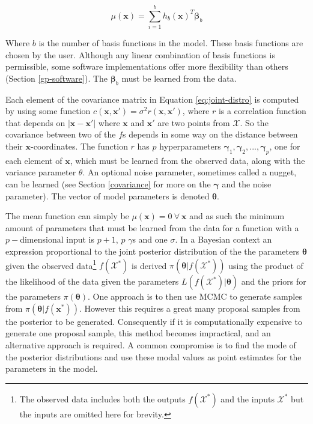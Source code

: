 \documentclass[
  12pt,
  a4paper,
  twoside]{book}
\begin{document}
\begin{equation}
\label{eq:mean-function}
\mu(\mathbf{x}) = \sum_{i=1}^b h_b(\mathbf{x})^T \mathbf{\beta}_b
\end{equation}

Where \(b\) is the number of basis functions in the model. These basis functions are chosen by the user. Although any linear combination of basis functions is permissible, some software implementations offer more flexibility than others (Section \ref{gp-software}). The \(\mathbf{\beta}_b\) must be learned from the data.

Each element of the covariance matrix in Equation \eqref{eq:joint-distro} is computed by using some function \(c(\mathbf{x}, \mathbf{x'})=\sigma^2 r(\mathbf{x}, \mathbf{x'})\), where \(r\) is a correlation function that depends on \(|\mathbf{x} - \mathbf{x'}|\) where \(\mathbf{x}\) and \(\mathbf{x'}\) are two points from \(\mathcal{X}\). So the covariance between two of the \(f\)s depends in some way on the distance between their \(\mathbf{x}\)-coordinates. The function \(r\) has \(p\) hyperparameters \(\mathbf{\gamma}_1,\mathbf{\gamma}_2,...,\mathbf{\gamma}_p\), one for each element of \(\mathbf{x}\), which must be learned from the observed data, along with the variance parameter \(\theta\). An optional noise parameter, sometimes called a nugget, can be learned (see Section \ref{covariance} for more on the \(\mathbf{\gamma}\) and the noise parameter). The vector of model parameters is denoted \(\mathbf{\theta}\).

The mean function can simply be \(\mu(\mathbf{x})=0~\forall~\mathbf{x}\) and as such the minimum amount of parameters that must be learned from the data for a function with a \(p-\)dimensional input is \(p+1\), \(p\) \(\gamma\)s and one \(\sigma\). In a Bayesian context an expression proportional to the joint posterior distribution of the the parameters \(\mathbf{\theta}\) given the observed data\footnote{The observed data includes both the outputs \(f(\mathcal{X^*})\) and the inputs \(\mathcal{X}^*\) but the inputs are omitted here for brevity.} \(f(\mathcal{X^*})\) is derived \(\pi(\mathbf{\theta}|f(\mathcal{X^*}))\) using the product of the likelihood of the data given the parameters \(L(f(\mathcal{X^*})| \mathbf{\theta})\) and the priors for the parameters \(\pi(\mathbf{\theta})\). One approach is to then use MCMC to generate samples from \(\pi(\mathbf{\theta}|f(\mathbf{\mathbf{x^*}}))\). However this requires a great many proposal samples from the posterior to be generated. Consequently if it is computationally expensive to generate one proposal sample, this method becomes impractical, and an alternative approach is required. A common compromise is to find the mode of the posterior distributions and use these modal values as point estimates for the parameters in the model.
\end{document}
